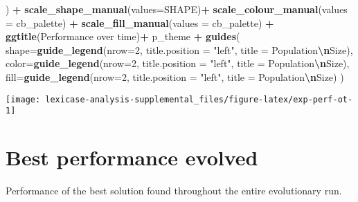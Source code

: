 \documentclass[
]{book}
\newenvironment{Shaded}{\begin{snugshade}}{\end{snugshade}}
\newcommand{\AttributeTok}[1]{\textcolor[rgb]{0.13,0.29,0.53}{#1}}
\newcommand{\DecValTok}[1]{\textcolor[rgb]{0.00,0.00,0.81}{#1}}
\newcommand{\FunctionTok}[1]{\textcolor[rgb]{0.13,0.29,0.53}{\textbf{#1}}}
\newcommand{\NormalTok}[1]{#1}
\newcommand{\SpecialCharTok}[1]{\textcolor[rgb]{0.81,0.36,0.00}{\textbf{#1}}}
\newcommand{\StringTok}[1]{\textcolor[rgb]{0.31,0.60,0.02}{#1}}
\begin{document}
\begin{Shaded}
\begin{Highlighting}[]
\NormalTok{  ) }\SpecialCharTok{+}
  \FunctionTok{scale\_shape\_manual}\NormalTok{(}\AttributeTok{values=}\NormalTok{SHAPE)}\SpecialCharTok{+}
  \FunctionTok{scale\_colour\_manual}\NormalTok{(}\AttributeTok{values =}\NormalTok{ cb\_palette) }\SpecialCharTok{+}
  \FunctionTok{scale\_fill\_manual}\NormalTok{(}\AttributeTok{values =}\NormalTok{ cb\_palette) }\SpecialCharTok{+}
  \FunctionTok{ggtitle}\NormalTok{(}\StringTok{\textquotesingle{}Performance over time\textquotesingle{}}\NormalTok{)}\SpecialCharTok{+}
\NormalTok{  p\_theme }\SpecialCharTok{+}
  \FunctionTok{guides}\NormalTok{(}
    \AttributeTok{shape=}\FunctionTok{guide\_legend}\NormalTok{(}\AttributeTok{nrow=}\DecValTok{2}\NormalTok{, }\AttributeTok{title.position =} \StringTok{"left"}\NormalTok{, }\AttributeTok{title =} \StringTok{\textquotesingle{}Population}\SpecialCharTok{\textbackslash{}n}\StringTok{Size\textquotesingle{}}\NormalTok{),}
    \AttributeTok{color=}\FunctionTok{guide\_legend}\NormalTok{(}\AttributeTok{nrow=}\DecValTok{2}\NormalTok{, }\AttributeTok{title.position =} \StringTok{"left"}\NormalTok{, }\AttributeTok{title =} \StringTok{\textquotesingle{}Population}\SpecialCharTok{\textbackslash{}n}\StringTok{Size\textquotesingle{}}\NormalTok{),}
    \AttributeTok{fill=}\FunctionTok{guide\_legend}\NormalTok{(}\AttributeTok{nrow=}\DecValTok{2}\NormalTok{, }\AttributeTok{title.position =} \StringTok{"left"}\NormalTok{, }\AttributeTok{title =} \StringTok{\textquotesingle{}Population}\SpecialCharTok{\textbackslash{}n}\StringTok{Size\textquotesingle{}}\NormalTok{)}
\NormalTok{  )}
\end{Highlighting}
\end{Shaded}

\texttt{[image: lexicase-analysis-supplemental\_files/figure-latex/exp-perf-ot-1]}

\hypertarget{best-performance-evolved}{%
\section{Best performance evolved}\label{best-performance-evolved}}

Performance of the best solution found throughout the entire evolutionary run.
\end{document}
